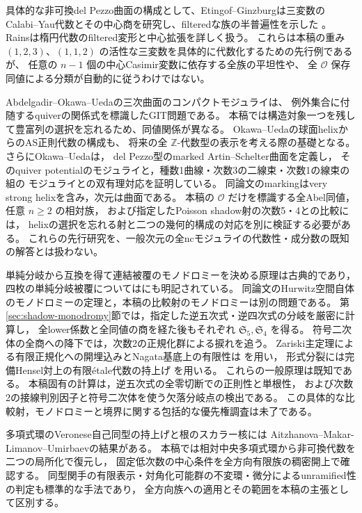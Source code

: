 \documentclass[a4paper,11pt]{ltjsarticle}
\numberwithin{equation}{section}
\theoremstyle{plain}
\theoremstyle{definition}
\theoremstyle{remark}
\newcommand{\OO}{\mathcal O}
\begin{document}
具体的な非可換del Pezzo曲面の構成として、Etingof--Ginzburgは三変数の
Calabi--Yau代数とその中心商を研究し、filteredな族の半普遍性を示した
\cite[Theorems 3.4.4--3.4.5]{EG2010}。
Rainsは楕円代数のfiltered変形と中心拡張を詳しく扱う\cite{Rains2022}。
これらは本稿の重み $(1,2,3)$、$(1,1,2)$ の活性な三変数を具体的に代数化するための先行例であるが、
任意の $n-1$ 個の中心Casimir変数に依存する全族の平坦性や、
全 $\OO$ 保存同値による分類が自動的に従うわけではない。

Abdelgadir--Okawa--Uedaの三次曲面のコンパクトモジュライ\cite{AOU2024}は、
例外集合に付随するquiverの関係式を標識したGIT問題である。
本稿では構造対象一つを残して豊富列の選択を忘れるため、同値関係が異なる。
Okawa--Uedaの球面helixからのAS正則代数の構成\cite{OkawaUeda2020}も、
将来の全 $\mathbb Z$-代数型の表示を考える際の基礎となる。
さらにOkawa--Ueda\cite[Definitions~1.1, 6.1, Theorem~6.4]{OkawaUeda2025}は，
del Pezzo型のmarked Artin--Schelter曲面を定義し，
そのquiver potentialのモジュライと，種数1曲線・次数3の二線束・次数1の線束の組の
モジュライとの双有理対応を証明している。
同論文のmarkingはvery strong helixを含み，次元は曲面である。
本稿の $\OO$ だけを標識する全Abel同値，任意 $n\ge2$ の相対族，
および指定したPoisson shadow射の次数5・4との比較には，
helixの選択を忘れる射と二つの幾何的構成の対応を別に検証する必要がある。
これらの先行研究を、一般次元の全ncモジュライの代数性・成分数の既知の解答とは扱わない。

単純分岐から互換を得て連結被覆のモノドロミーを決める原理は古典的であり，
四枚の単純分岐被覆については\cite[Introduction]{AllcockHall2008}にも明記されている。
同論文のHurwitz空間自体のモノドロミーの定理と，本稿の比較射のモノドロミーは別の問題である。
第\ref{sec:shadow-monodromy}節では，指定した逆五次式・逆四次式の分岐を厳密に計算し，
全lower係数と全同値の商を経た後もそれぞれ $\mathfrak S_5,\mathfrak S_4$ を得る。
符号二次体の全商への降下では，次数2の正規化群による捩れを追う。
Zariski主定理による有限正規化への開埋込みとNagata基底上の有限性は
\cite[Tags 02LR, 03GR]{StacksProject}を用い，
形式分裂には完備Hensel対上の有限\'{e}tale代数の持上げ
\cite[Tags 0ALJ, 09ZL]{StacksProject}を用いる。
これらの一般原理は既知である。
本稿固有の計算は，逆五次式の全零切断での正則性と単根性，
および次数2の接線判別因子と符号二次体を使う欠落分岐点の検出である。
この具体的な比較射，モノドロミーと境界に関する包括的な優先権調査は未了である。

多項式環のVeronese自己同型の持上げと根のスカラー核には
Aitzhanova--Makar-Limanov--Umirbaev\cite[Corollaries~4--5]{AMU2025}の結果がある。
本稿では相対中央多項式環から非可換代数を二つの局所化で復元し，
固定低次数の中心条件を全方向有限族の稠密開上で確認する。
同型関手の有限表示・対角化可能群の不変環・微分によるunramified性の判定も標準的な手法であり，
全方向族への適用とその範囲を本稿の主張として区別する。
\end{document}

